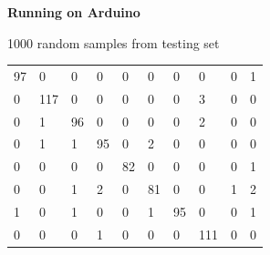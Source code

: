 \documentclass[xcolor=dvipsnames]{beamer}
\begin{document}
\begin{frame}{\bf Running on Arduino}

1000 random samples from testing set

{\tiny
\begin{table}[]
\centering
\begin{tabular}{llllllllll}
97                                                                 & 0                                      & 0              & 0               & 0               & 0               & 0            & 0              & 0              & 1               \\
0                                                                  & 117                                    & 0              & 0               & 0               & 0               & 0            & 3              & 0              & 0               \\
0                                                                  & 1                                      & 96             & 0               & 0               & 0               & 0            & 2              & 0              & 0               \\
0                                                                  & 1                                      & 1              & 95              & 0               & 2               & 0            & 0              & 0              & 0               \\
0                                                                  & 0                                      & 0              & 0               & 82              & 0               & 0            & 0              & 0              & 1               \\
0                                                                  & 0                                      & 1              & 2               & 0               & 81              & 0            & 0              & 1              & 2               \\
1                                                                  & 0                                      & 1              & 0               & 0               & 1               & 95           & 0              & 0              & 1               \\
0                                                                  & 0                                      & 0              & 1               & 0               & 0               & 0            & 111            & 0              & 0               \\

\end{tabular}
\end{table}}
\end{frame}
\end{document}
